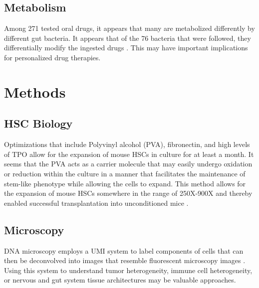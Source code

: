 \documentclass[]{book}
\begin{document}
\section{Metabolism}\label{metabolism}

Among 271 tested oral drugs, it appears that many are metabolized
differently by different gut bacteria. It appears that of the 76
bacteria that were followed, they differentially modify the ingested
drugs \citep{zimmermann2019mapping}. This may have important
implications for personalized drug therapies.

\chapter{Methods}\label{methods}

\section{HSC Biology}\label{hsc-biology}

Optimizations that include Polyvinyl alcohol (PVA), fibronectin, and
high levels of TPO allow for the expansion of mouse HSCs in culture for
at least a month. It seems that the PVA acts as a carrier molecule that
may easily undergo oxidation or reduction within the culture in a manner
that facilitates the maintenance of stem-like phenotype while allowing
the cells to expand. This method allows for the expansion of mouse HSCs
somewhere in the range of 250X-900X and thereby enabled successful
transplantation into unconditioned mice \citep{wilkinson2019long}.

\section{Microscopy}\label{microscopy}

DNA microscopy employs a UMI system to label components of cells that
can then be deconvolved into images that resemble fluorescent microscopy
images \citep{weinstein2019dna}. Using this system to understand tumor
heterogeneity, immune cell heterogeneity, or nervous and gut system
tissue architectures may be valuable approaches.


\end{document}
